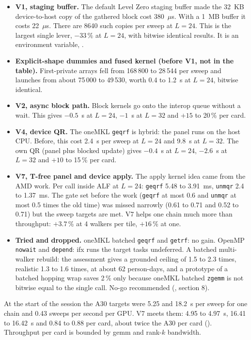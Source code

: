 \begin{itemize}
\item \textbf{V1, staging buffer.} The default Level Zero staging buffer made the 32~KB device-to-host copy of the gathered block cost 380~$\mu$s. With a 1~MB buffer it costs 22~$\mu$s. There are 8640 such copies per sweep at $L=24$. This is the largest single lever, $-33\,\%$ at $L=24$, with bitwise identical results. It is an environment variable, .
\item \textbf{Explicit-shape dummies and fused kernel (before V1, not in the table).} First-private arrays fell from 168\,800 to 28\,544 per sweep and launches from about 75\,000 to 49\,530, worth 0.4 to 1.2~s at $L=24$, bitwise identical.
\item \textbf{V2, async block path.} Block kernels go onto the interop queue without a wait. This gives $-0.5$~s at $L=24$, $-1$~s at $L=32$ and $+15$ to 20\,\% per card.
\item \textbf{V4, device QR.} The oneMKL \texttt{geqrf} is hybrid: the panel runs on the host CPU. Before, this cost 2.4~s per sweep at $L=24$ and 9.8~s at $L=32$. The own QR (panel plus blocked update) gives $-0.4$~s at $L=24$, $-2.6$~s at $L=32$ and $+10$ to 15\,\% per card.
\item \textbf{V7, T-free panel and device apply.} The apply kernel idea came from the AMD work. Per call inside ALF at $L=24$: \texttt{geqrf} 5.48 to 3.91~ms, \texttt{unmqr} 2.4 to 1.37~ms. The gate set before the work (\texttt{geqrf} at most 0.6 and \texttt{unmqr} at most 0.5 times the old time) was missed narrowly (0.61 to 0.71 and 0.52 to 0.71) but the sweep targets are met. V7 helps one chain much more than throughput: $+3.7$\,\% at 4 walkers per tile, $+16$\,\% at one.
\item \textbf{Tried and dropped.} oneMKL batched \texttt{geqrf} and \texttt{getrf}: no gain. OpenMP \texttt{nowait} and \texttt{depend}: ifx runs the target tasks undeferred. A batched multi-walker rebuild: the assessment gives a grounded ceiling of 1.5 to 2.3 times, realistic 1.3 to 1.6 times, at about 62 person-days, and a prototype of a batched hopping wrap saves 2\,\% only because oneMKL batched \texttt{zgemm} is not bitwise equal to the single call. No-go recommended (, section 8).
\end{itemize}

At the start of the session the A30 targets were 5.25 and 18.2~s per sweep for one chain and 0.43 sweeps per second per GPU. V7 meets them: 4.95 to 4.97~s, 16.41 to 16.42~s and 0.84 to 0.88 per card, about twice the A30 per card (). Throughput per card is bounded by gemm and rank-$k$ bandwidth.

